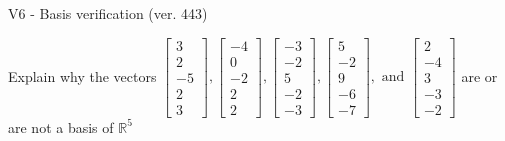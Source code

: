 \begin{exercise}
  \begin{exerciseTitle}V6 - Basis verification (ver. 443)\end{exerciseTitle}
  \begin{exerciseStatement}
    Explain why the vectors \(\left[\begin{array}{r}
3 \\
2 \\
-5 \\
2 \\
3
\end{array}\right] , \left[\begin{array}{r}
-4 \\
0 \\
-2 \\
2 \\
2
\end{array}\right] , \left[\begin{array}{r}
-3 \\
-2 \\
5 \\
-2 \\
-3
\end{array}\right] , \left[\begin{array}{r}
5 \\
-2 \\
9 \\
-6 \\
-7
\end{array}\right] , \text{ and } \left[\begin{array}{r}
2 \\
-4 \\
3 \\
-3 \\
-2
\end{array}\right]\) are or are not a basis of \(\mathbb{R}^5\)	



\end{exerciseStatement}
\end{exercise}

